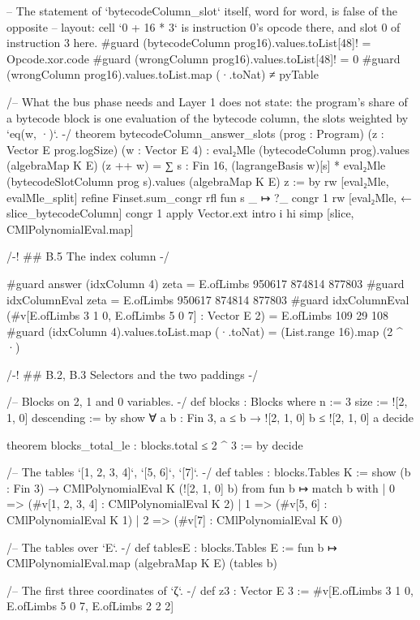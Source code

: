 \begin{leancode}
-- The statement of `bytecodeColumn_slot` itself, word for word, is false of the opposite
-- layout: cell `0 + 16 * 3` is instruction 0's opcode there, and slot 0 of instruction 3 here.
#guard (bytecodeColumn prog16).values.toList[48]! = Opcode.xor.code
#guard (wrongColumn prog16).values.toList[48]! = 0
#guard (wrongColumn prog16).values.toList.map (·.toNat) ≠ pyTable

/-- What the bus phase needs and Layer 1 does not state: the program's share of a bytecode
block is one evaluation of the bytecode column, the slots weighted by `eq(w, ·)`. -/
theorem bytecodeColumn_answer_slots (prog : Program) (z : Vector E prog.logSize)
    (w : Vector E 4) :
    eval₂Mle (bytecodeColumn prog).values (algebraMap K E) (z ++ w) =
      ∑ s : Fin 16, (lagrangeBasis w)[s] *
        eval₂Mle (bytecodeSlotColumn prog s).values (algebraMap K E) z := by
  rw [eval₂Mle, evalMle_split]
  refine Finset.sum_congr rfl fun s _ ↦ ?_
  congr 1
  rw [eval₂Mle, ← slice_bytecodeColumn]
  congr 1
  apply Vector.ext
  intro i hi
  simp [slice, CMlPolynomialEval.map]

/-! ## B.5 The index column -/

#guard answer (idxColumn 4) zeta = E.ofLimbs 950617 874814 877803
#guard idxColumnEval zeta = E.ofLimbs 950617 874814 877803
#guard idxColumnEval (#v[E.ofLimbs 3 1 0, E.ofLimbs 5 0 7] : Vector E 2) = E.ofLimbs 109 29 108
#guard (idxColumn 4).values.toList.map (·.toNat) = (List.range 16).map (2 ^ ·)

/-! ## B.2, B.3 Selectors and the two paddings -/

/-- Blocks on 2, 1 and 0 variables. -/
def blocks : Blocks where
  n := 3
  size := ![2, 1, 0]
  descending := by
    show ∀ a b : Fin 3, a ≤ b → ![2, 1, 0] b ≤ ![2, 1, 0] a
    decide

theorem blocks_total_le : blocks.total ≤ 2 ^ 3 := by decide

/-- The tables `[1, 2, 3, 4]`, `[5, 6]`, `[7]`. -/
def tables : blocks.Tables K :=
  show (b : Fin 3) → CMlPolynomialEval K (![2, 1, 0] b) from fun b ↦ match b with
    | 0 => (#v[1, 2, 3, 4] : CMlPolynomialEval K 2)
    | 1 => (#v[5, 6] : CMlPolynomialEval K 1)
    | 2 => (#v[7] : CMlPolynomialEval K 0)

/-- The tables over `E`. -/
def tablesE : blocks.Tables E := fun b ↦ CMlPolynomialEval.map (algebraMap K E) (tables b)

/-- The first three coordinates of `ζ`. -/
def z3 : Vector E 3 := #v[E.ofLimbs 3 1 0, E.ofLimbs 5 0 7, E.ofLimbs 2 2 2]


\end{leancode}
